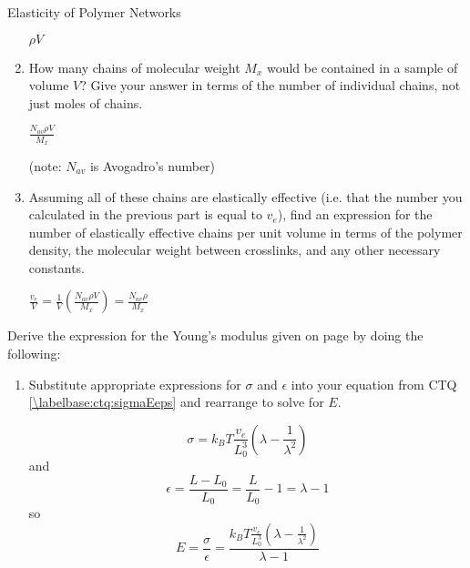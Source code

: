 \begin{activity}{Elasticity of Polymer Networks}
\begin{exercises}
\begin{enumerate}
				\begin{solution}{}
				$\rho V$
				\end{solution}
			
			\item How many chains of molecular weight $M_x$ would be contained in a sample of volume $V$?  Give your answer in terms of the  number of individual chains, not just moles of chains.
			
				\begin{solution}{}
				$\frac{N_{av} \rho V}{M_x}$
					
					(note: $N_{av}$ is Avogadro's number)
				\end{solution}
			
			\item Assuming all of these chains are elastically effective (i.e. that the number you calculated in the previous part is equal to $v_e$), find an expression for the number of elastically effective chains per unit volume in terms of the polymer density, the molecular weight between crosslinks, and any other necessary constants.
			
				\begin{solution}{}
				$\frac{v_e}{V} = \frac{1}{V}\left(\frac{N_{av} \rho V}{M_x}\right) = \frac{N_{av} \rho}{M_x}$
				\end{solution}
		\end{enumerate}
		
	\exercise Derive the expression for the Young's modulus given on page \pageref{\labelbase:eqn:youngsmodulus} by doing the following:
		
		\begin{enumerate}
			\item Substitute appropriate expressions for $\sigma$ and $\epsilon$ into your equation from CTQ \ref{\labelbase:ctq:sigmaEeps} and rearrange to solve for $E$.
			
				\begin{solution}{}
					\begin{equation*}
						\sigma = k_BT\frac{v_e}{L_0^3}\left(\lambda - \frac{1}{\lambda^2}\right)
					\end{equation*}
					and
					\begin{equation*}
						\epsilon = \frac{L-L_0}{L_0} = \frac{L}{L_0} -1 = \lambda - 1
					\end{equation*}
					so
					\begin{equation*}
						E = \frac{\sigma}{\epsilon} = \frac{k_BT\frac{v_e}{L_0^3}\left(\lambda - \frac{1}{\lambda^2}\right)}{\lambda - 1}
					\end{equation*}
				\end{solution}
			

\end{enumerate}
\end{exercises}
\end{activity}
